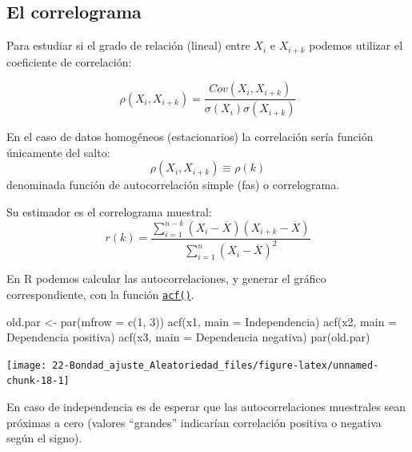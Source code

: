 \documentclass[
  10pt,
]{book}
\newenvironment{Shaded}{\begin{snugshade}}{\end{snugshade}}
\newcommand{\AttributeTok}[1]{\textcolor[rgb]{0.77,0.63,0.00}{#1}}
\newcommand{\DecValTok}[1]{\textcolor[rgb]{0.00,0.00,0.81}{#1}}
\newcommand{\FunctionTok}[1]{\textcolor[rgb]{0.00,0.00,0.00}{#1}}
\newcommand{\NormalTok}[1]{#1}
\newcommand{\OtherTok}[1]{\textcolor[rgb]{0.56,0.35,0.01}{#1}}
\newcommand{\StringTok}[1]{\textcolor[rgb]{0.31,0.60,0.02}{#1}}
\theoremstyle{break}
\theoremstyle{nonumberplain}
\begin{document}
\hypertarget{correlograma}{%
\subsection{El correlograma}\label{correlograma}}

Para estudiar si el grado de relación (lineal) entre \(X_{i}\) e
\(X_{i+k}\) podemos utilizar el coeficiente de correlación:

\[\rho\left(  X_{i},X_{i+k}\right) = \frac{Cov\left(  X_{i},X_{i+k}\right)    }
{\sigma\left(  X_{i}\right)  \sigma\left(  X_{i+k}\right)  }\]

En el caso de datos homogéneos (estacionarios) la correlación sería función únicamente del salto:
\[\rho\left(  X_{i},X_{i+k}\right)  \equiv\rho\left(  k\right)\]
denominada función de autocorrelación simple (fas) o correlograma.

Su estimador es el correlograma muestral:
\[r(k)=\frac{\sum_{i=1}^{n-k}(X_{i}-\overline{X})(X_{i+k}-\overline{X})}
{\sum_{i=1}^{n}(X_{i}-\overline{X})^{2}}\]

En R podemos calcular las autocorrelaciones, y generar el gráfico correspondiente, con la función \href{https://rdrr.io/r/stats/acf.html}{\texttt{acf()}}.

\begin{Shaded}
\begin{Highlighting}[]
\NormalTok{old.par }\OtherTok{\textless{}{-}} \FunctionTok{par}\NormalTok{(}\AttributeTok{mfrow =} \FunctionTok{c}\NormalTok{(}\DecValTok{1}\NormalTok{, }\DecValTok{3}\NormalTok{))}
\FunctionTok{acf}\NormalTok{(x1, }\AttributeTok{main =} \StringTok{\textquotesingle{}Independencia\textquotesingle{}}\NormalTok{)}
\FunctionTok{acf}\NormalTok{(x2, }\AttributeTok{main =} \StringTok{\textquotesingle{}Dependencia positiva\textquotesingle{}}\NormalTok{)}
\FunctionTok{acf}\NormalTok{(x3, }\AttributeTok{main =} \StringTok{\textquotesingle{}Dependencia negativa\textquotesingle{}}\NormalTok{)}
\FunctionTok{par}\NormalTok{(old.par)}
\end{Highlighting}
\end{Shaded}

\begin{center}\texttt{[image: 22-Bondad\_ajuste\_Aleatoriedad\_files/figure-latex/unnamed-chunk-18-1]} \end{center}

En caso de independencia es de esperar que las autocorrelaciones muestrales sean próximas a cero (valores ``grandes'' indicarían correlación positiva o negativa según el signo).
\end{document}
